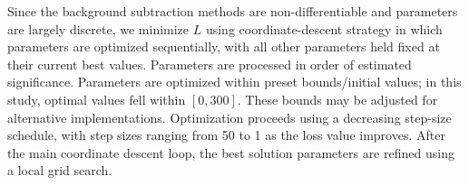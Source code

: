 \documentclass[iucr]{iucrjournals}
\begin{document}

Since the background subtraction methods are non-differentiable and parameters are largely discrete, we minimize $L$ using coordinate-descent strategy in which parameters are optimized sequentially, with all other parameters held fixed at their current best values. Parameters are processed in order of estimated significance. Parameters are optimized within preset bounds/initial values; in this study, optimal values fell within $[0,300]$. These bounds may be adjusted for alternative implementations. Optimization proceeds using a decreasing step-size schedule, with step sizes ranging from 50 to 1 as the loss value improves. After the main coordinate descent loop, the best solution parameters are refined using a local grid search.


\end{document}
